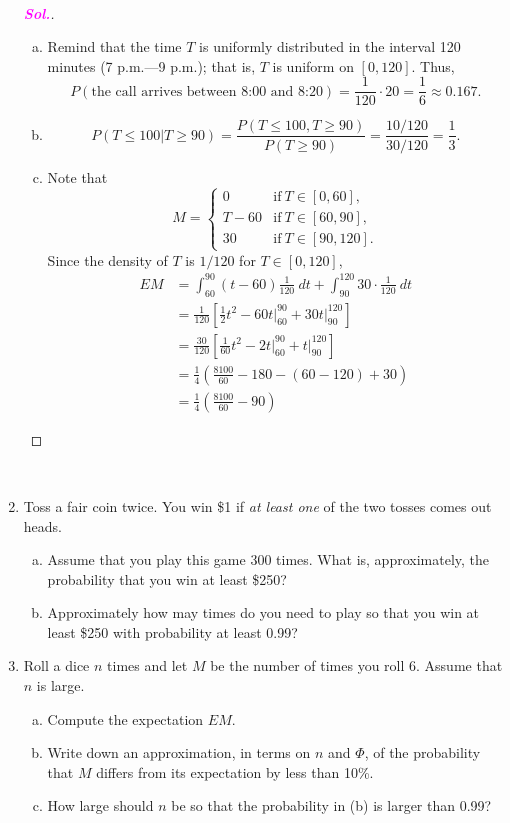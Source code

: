 \documentclass[12pt,a4paper]{article}
\theoremstyle{definition}
\theoremstyle{definition}
\theoremstyle{definition}
\theoremstyle{definition}
\theoremstyle{remark}
\theoremstyle{definition}
\newcommand{\sol}{\textcolor{magenta}{\bf \textit{Sol.}}\quad}
\begin{document}
\begin{enumerate}[\bf 1.]
\begin{enumerate}[(a)]
	\end{enumerate}\ \begin{proof}[\sol]
	\begin{enumerate}[(a)]
		\item Remind that the time $T$ is uniformly distributed in the interval 120 minutes (7 p.m.---9 p.m.); that is, $T$ is uniform on $[0,120]$. Thus, \[
		P(\text{the call arrives between 8:00 and 8:20})=\frac{1}{120}\cdot20=\frac{1}{6}\approx 0.167.
		\]
		\item \[
		{P(T\leq100|T\geq 90)}=\frac{P(T\leq100, T\geq 90)}{P(T\geq 90)}=\frac{10/120}{30/120}=\frac{1}{3}.
		\]
		\item Note that \[
		M=\begin{cases}
		0 &\text{if}\ T\in[0,60],\\
		T-60 &\text{if}\ T\in[60,90],\\
		30 &\text{if}\ T\in[90,120].
		\end{cases}
		\] Since the density of $T$ is $1/120$ for $T\in[0,120]$, \begin{align*}
		EM&=\int_{60}^{90}(t-60)\frac{1}{120}\ dt+\int_{90}^{120}30\cdot\frac{1}{120}\ dt\\
		&=\frac{1}{120}\left[\frac{1}{2}t^2-60t\Bigg|_{60}^{90}+30t\Bigg|_{90}^{120}\right]\\
		&=\frac{30}{120}\left[\frac{1}{60}t^2-2t\Bigg|_{60}^{90}+t\Bigg|_{90}^{120}\right]\\
		&=\frac{1}{4}\left(\frac{8100}{60}-180-(60-120)+30\right)\\
		&=\frac{1}{4}\left(\frac{8100}{60}-90\right)
		\end{align*}
	\end{enumerate}
	\end{proof}\
	\item Toss a fair coin twice. You win \$1 if \textit{at least one} of the two tosses comes out heads.\begin{enumerate}[(a)]
		\item Assume that you play this game 300 times. What is, approximately, the probability that you win at least \$250?
		\item Approximately how may times do you need to play so that you win at least \$250 with probability at least 0.99?
	\end{enumerate}
	\item Roll a dice $n$ times and let $M$ be the number of times you roll 6. Assume that $n$ is large. \begin{enumerate}[(a)]
		\item Compute the expectation $EM$.
		\item Write down an approximation, in terms on $n$ and $\Phi$, of the probability that $M$ differs from its expectation by less than 10\%.
		\item How large should $n$ be so that the probability in (b) is larger than 0.99?
	\end{enumerate}
\end{enumerate}
\end{document}
